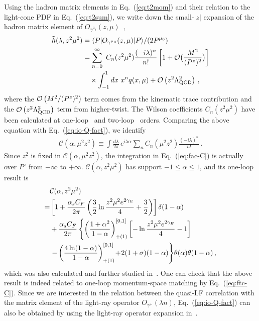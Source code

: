 \documentclass[aps,rmp,reprint,amsmath,amssymb,graphicx,longbibliography]{revtex4-1} %
\newcommand{\nn}{\nonumber}
\DeclareRobustCommand{\eq}[1]{Eq.~(\ref{eq:#1})}
\begin{document}
Using the hadron matrix elements in \eq{t2mom} and their relation to the light-cone PDF
in \eq{t2sum},
we write down the small-$|z|$ expansion of the hadron matrix element of $O_{\gamma^{\mu_0}}(z,\mu) $~\cite{Izubuchi:2018srq},
\begin{align}\label{eq:ope}
	\tilde{h}(\lambda,z^2\mu^2)&=\langle P| O_{\gamma^{\mu_0}}(z,\mu) |P\rangle/(2P^{\mu_0}) \nn\\
	&= \sum_{n=0}^\infty\ C_n(z^2\mu^2){(-i\lambda)^n\over n!}\left[1+{\cal O}\big({M^2\over (P^z)^2}\big)\right]\nn\\
	&\quad\times \int_{-1}^1 dx\ x^n q(x,\mu) + {\cal O}\left(z^2\Lambda_{\text{QCD}}^2\right)\,,
\end{align}
where the ${\cal O}\left(M^2/(P^z)^2\right)$ term comes from the kinematic trace contribution and
the ${\cal O}\left(z^2\Lambda_{\text{QCD}}^2\right)$ term from higher-twist.
The Wilson coefficients $C_n(z^2\mu^2)$ have been calculated at one-loop~\cite{Izubuchi:2018srq} and two-loop~\cite{Li:2020xml} orders.
Comparing the above equation with Eq.~(\ref{eq:io-Q-fact}),
we identify
\begin{align}  \label{eq:fac-C}
	\mathcal{C} (\alpha, {\mu}^2 z^2) \equiv \int\! \frac{d \lambda}{2 \pi} \,
	e^{i  \lambda \alpha}  \sum_n C_n ({\mu}^2 z^2)  \frac{(-i \lambda)^n}{n!}
	\,.
\end{align}
Since $z^2$ is fixed in $\mathcal{C} (\alpha, {\mu}^2 z^2)$, the integration in \eq{fac-C} is actually over $P^z$ from $-\infty$ to $+\infty$.
$\mathcal{C}(\alpha,z^2\mu^2)$ has support $-1 \le \alpha \le 1$,
and its one-loop result is
\begin{align} \label{eq:ps-c}
	&{\cal C}(\alpha,z^2\mu^2)\\
	=& \left[ 1+ {\alpha_sC_F\over 2\pi}\left({3\over2}\ln{z^2\mu^2e^{2\gamma_E}\over 4}+{3\over2}\right)\right]\delta(1-\alpha)\nn
	\\
	&+ {\alpha_sC_F\over 2\pi}\left\{\left({1+\alpha^2\over 1-\alpha}\right)^{[0,1]}_{+(1)}\left[-\ln{z^2\mu^2e^{2\gamma_E}\over 4}-1\right]\right.\nn\\
	&\left. - \left(4\ln(1-\alpha)\over 1-\alpha\right)^{[0,1]}_{+(1)}\!  +\!2(1+\sigma)(1-\alpha)\right\}\!\theta(\alpha)\theta(1-\alpha)
	\,,\nn
\end{align}
which was also calculated and further studied in~\cite{Ji:2017rah,Radyushkin:2017lvu,Radyushkin:2018cvn,Zhang:2018ggy,Li:2020xml}.
One can check that the above result is indeed related to one-loop momentum-space
matching by Eq.~(\ref{eq:ftc-C}).
Since we are interested in the relation between the
quasi-LF correlation with the matrix element of the light-ray operator
$O_{\gamma^+}(\lambda n)$, Eq.~(\ref{eq:io-Q-fact})
can also be obtained by using the light-ray operator
expansion in~\cite{Balitsky:1987bk,Braun:1994jq,Braun:2007wv}.
\end{document}
